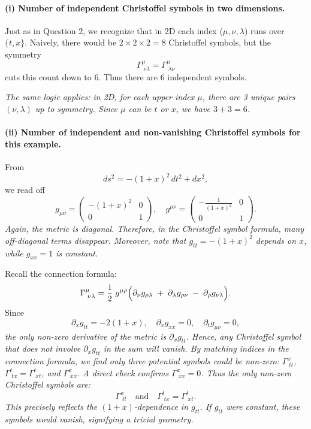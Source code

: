     \paragraph{(i) Number of independent Christoffel symbols in two dimensions.}

    Just as in Question 2, we recognize that in 2D each index (\(\mu,\nu,\lambda\)) runs over \(\{t,x\}\). Naively, there would be \(2 \times 2 \times 2 = 8\) Christoffel symbols, but the symmetry
    \[
        \Gamma^\mu_{\;\nu\lambda} = \Gamma^\mu_{\;\lambda\nu}
    \]
    cuts this count down to \(6\). Thus there are \(\boxed{6}\) independent symbols.

    \emph{The same logic applies: in 2D, for each upper index \(\mu\), there are 3 unique pairs \((\nu,\lambda)\) up to symmetry. Since \(\mu\) can be \(t\) or \(x\), we have \(3+3 = 6\).}

    \paragraph{(ii) Number of independent and non-vanishing Christoffel symbols for this example.}

    From
    \[
        ds^2 = -(1+x)^2 \, dt^2 + dx^2,
    \]
    we read off
    \[
        g_{\mu\nu} =
        \begin{pmatrix}
            -(1+x)^2 & 0 \\
            0        & 1
        \end{pmatrix},
        \quad
        g^{\mu\nu} =
        \begin{pmatrix}
            -\frac{1}{(1+x)^2} & 0 \\
            0                  & 1
        \end{pmatrix}.
    \]
    \emph{Again, the metric is diagonal. Therefore, in the Christoffel symbol formula, many off-diagonal terms disappear. Moreover, note that \(g_{tt} = -(1+x)^2\) depends on \(x\), while \(g_{xx} = 1\) is constant.}

    Recall the connection formula:
    \[
        \Gamma^{\mu}_{\;\nu\lambda}
        =
        \frac{1}{2}\;g^{\mu\rho}
        \Bigl(
        \partial_\nu g_{\rho\lambda}
        \;+\;
        \partial_\lambda g_{\rho\nu}
        \;-\;
        \partial_\rho g_{\nu\lambda}
        \Bigr).
    \]
    Since
    \[
        \partial_x g_{tt} = -2(1+x),
        \quad
        \partial_x g_{xx} = 0,
        \quad
        \partial_t g_{\mu\nu} = 0,
    \]
    \emph{the only non-zero derivative of the metric is \(\partial_x g_{tt}\). Hence, any Christoffel symbol that does not involve \(\partial_x g_{tt}\) in the sum will vanish. By matching indices in the connection formula, we find only three potential symbols could be non-zero: \(\Gamma^x_{\;tt}\), \(\Gamma^t_{\;tx} = \Gamma^t_{\;xt}\), and \(\Gamma^x_{\;xx}\). A direct check confirms \(\Gamma^x_{\;xx} = 0\). Thus the only non-zero Christoffel symbols are:}
    \[
        \Gamma^x_{\;tt}
        \quad \text{and} \quad
        \Gamma^t_{\;tx} = \Gamma^t_{\;xt}.
    \]
    \emph{This precisely reflects the \((1+x)\)-dependence in \(g_{tt}\). If \(g_{tt}\) were constant, these symbols would vanish, signifying a trivial geometry.}

